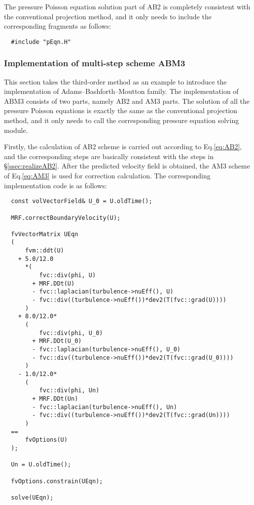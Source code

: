 \documentclass{article}
\begin{document}
The pressure Poisson equation solution part of AB2 is completely consistent with the conventional projection method, and it only needs to include the corresponding fragments as follows:

\begin{lstlisting}
  #include "pEqn.H"
\end{lstlisting}


\subsubsection{Implementation of multi-step scheme ABM3}

This section takes the third-order method as an example to introduce the implementation of Adams--Bashforth--Moutton family. The implementation of ABM3 consists of two parts, namely AB2 and AM3 parts. The solution of all the pressure Poisson equations is exactly the same as the conventional projection method, and it only needs to call the corresponding pressure equation solving module.

Firstly, the calculation of AB2 scheme is carried out according to Eq.\eqref{eq:AB2}, and the corresponding steps are basically consistent with the steps in \S\ref{ssec:realizeAB2}. After the predicted velocity field is obtained, the AM3 scheme of Eq.\eqref{eq:AM3} is used for correction calculation. The corresponding implementation code is as follows:

\begin{lstlisting}
  const volVectorField& U_0 = U.oldTime();

  MRF.correctBoundaryVelocity(U);

  fvVectorMatrix UEqn
  (
      fvm::ddt(U)
    + 5.0/12.0
      *(
          fvc::div(phi, U)
        + MRF.DDt(U)
        - fvc::laplacian(turbulence->nuEff(), U)
        - fvc::div((turbulence->nuEff())*dev2(T(fvc::grad(U))))
      )
    + 8.0/12.0*
      (
          fvc::div(phi, U_0)
        + MRF.DDt(U_0)
        - fvc::laplacian(turbulence->nuEff(), U_0)
        - fvc::div((turbulence->nuEff())*dev2(T(fvc::grad(U_0))))
      )
    - 1.0/12.0*
      (
          fvc::div(phi, Un)
        + MRF.DDt(Un)
        - fvc::laplacian(turbulence->nuEff(), Un)
        - fvc::div((turbulence->nuEff())*dev2(T(fvc::grad(Un))))
      )
  ==
      fvOptions(U)
  );

  Un = U.oldTime();

  fvOptions.constrain(UEqn);

  solve(UEqn);
\end{lstlisting}
\end{document}
